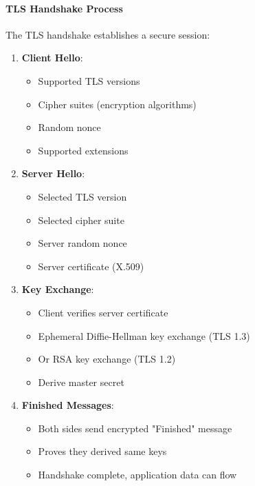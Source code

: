 \paragraph{TLS Handshake Process}

The TLS handshake establishes a secure session:

\begin{enumerate}
    \item \textbf{Client Hello}:
    \begin{itemize}
        \item Supported TLS versions
        \item Cipher suites (encryption algorithms)
        \item Random nonce
        \item Supported extensions
    \end{itemize}
    
    \item \textbf{Server Hello}:
    \begin{itemize}
        \item Selected TLS version
        \item Selected cipher suite
        \item Server random nonce
        \item Server certificate (X.509)
    \end{itemize}
    
    \item \textbf{Key Exchange}:
    \begin{itemize}
        \item Client verifies server certificate
        \item Ephemeral Diffie-Hellman key exchange (TLS 1.3)
        \item Or RSA key exchange (TLS 1.2)
        \item Derive master secret
    \end{itemize}
    
    \item \textbf{Finished Messages}:
    \begin{itemize}
        \item Both sides send encrypted "Finished" message
        \item Proves they derived same keys
        \item Handshake complete, application data can flow
    \end{itemize}
\end{enumerate}

